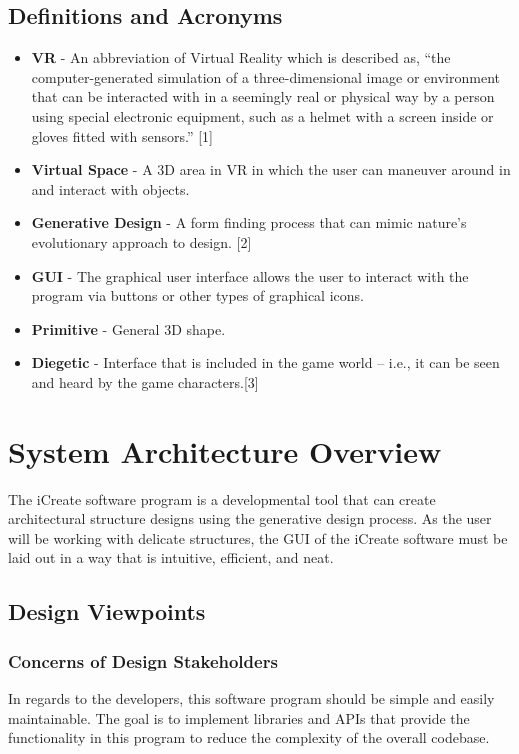 \documentclass[draftclsnofoot,onecolumn,compsoc]{IEEEtran}
\begin{document}
\subsection{Definitions and Acronyms}
\begin{itemize}
\item \textbf{VR} -  An abbreviation of Virtual Reality which is described as, “the computer-generated simulation of a three-dimensional image or environment that can be interacted with in a seemingly real or physical way by a person using special electronic equipment, such as a helmet with a screen inside or gloves fitted with sensors.” [1]
\item \textbf{Virtual Space} - A 3D area in VR in which the user can maneuver around in and interact with objects.
\item \textbf{Generative Design} - A form finding process that can mimic nature’s evolutionary approach to design. [2]
\item \textbf{GUI} - The graphical user interface allows the user to interact with the program via buttons or other types of graphical icons.
\item \textbf{Primitive} - General 3D shape.
\item \textbf{Diegetic} - Interface that is included in the game world -- i.e., it can be seen and heard by the game characters.[3]
\end{itemize}


\section{System Architecture Overview}

The iCreate software program is a developmental tool that can create architectural structure designs using the generative design process. As the user will be working with delicate structures, the GUI of the iCreate software must be laid out in a way that is intuitive, efficient, and neat.

\subsection{Design Viewpoints}

\subsubsection{Concerns of Design Stakeholders}
In regards to the developers, this software program should be simple and easily maintainable. The goal is to implement libraries and APIs that  provide the functionality in this program to reduce the complexity of the overall codebase. 
\end{document}

